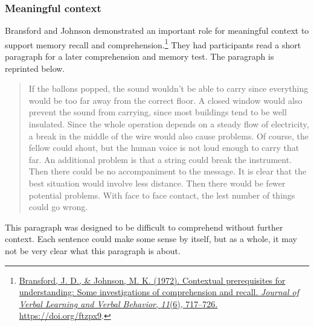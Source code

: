 \documentclass[
  oneside,
  12pt]{crumpbook}
\begin{document}
\hypertarget{meaningful-context}{%
\subsubsection{Meaningful context}\label{meaningful-context}}

Bransford and Johnson demonstrated an important role for meaningful context to support memory recall and comprehension.\footnote{\protect\hyperlink{ref-bransfordContextualPrerequisitesUnderstanding1972}{Bransford, J. D., \& Johnson, M. K. (1972). Contextual prerequisites for understanding: {Some} investigations of comprehension and recall. \emph{Journal of Verbal Learning and Verbal Behavior}, \emph{11}(6), 717--726. \url{https://doi.org/ftzpx9}}.} They had participants read a short paragraph for a later comprehension and memory test. The paragraph is reprinted below.

\begin{quote}
If the ballons popped, the sound wouldn't be able to carry since everything would be too far away from the correct floor. A closed window would also prevent the sound from carrying, since most buildings tend to be well insulated. Since the whole operation depends on a steady flow of electricity, a break in the middle of the wire would also cause problems. Of course, the fellow could shout, but the human voice is not loud enough to carry that far. An additional problem is that a string could break the instrument. Then there could be no accompaniment to the message. It is clear that the best situation would involve less distance. Then there would be fewer potential problems. With face to face contact, the lest number of things could go wrong.
\end{quote}

This paragraph was designed to be difficult to comprehend without further context. Each sentence could make some sense by itself, but as a whole, it may not be very clear what this paragraph is about.
\end{document}
